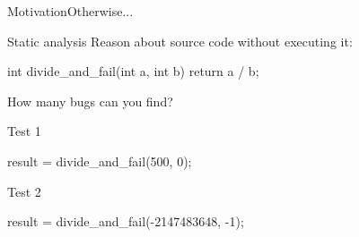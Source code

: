 \documentclass{beamer}
\begin{document}
\begin{frame}{Motivation}{Otherwise...}
  \begin{center}
  \end{center}
\end{frame}

\begin{frame}[fragile]{Static analysis}
  Reason about source code without executing it:
  \begin{pxcode}[language=C,gobble=4]
    int divide_and_fail(int a, int b) {
      return a / b;
    }
  \end{pxcode}
  How many bugs can you find?
  \pause
  \begin{block}{Test 1}
    \begin{pxcode}[language=C,gobble=6]
      result = divide_and_fail(500, 0);
    \end{pxcode}
  \end{block}
  \pause
  \begin{block}{Test 2}
    \begin{pxcode}[language=C,gobble=6]
      result = divide_and_fail(-2147483648, -1);
    \end{pxcode}
  \end{block}
\end{frame}
\end{document}
